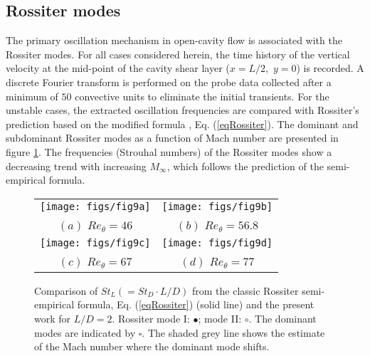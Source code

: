 \documentclass{jfm}
\begin{document}
\subsection{Rossiter modes} 
\label{RM}
The primary oscillation mechanism in open-cavity flow is associated with the Rossiter modes. For all cases considered herein, the time history of the vertical velocity at the mid-point of the cavity shear layer ($x=L/2,$ $y=0$) is recorded. A discrete Fourier transform is performed on the probe data collected after a minimum of $50$ convective units to eliminate the initial transients. For the unstable cases, the extracted oscillation frequencies  are compared with Rossiter's prediction based on the modified formula \citep{Heller:AIAA75}, Eq. (\ref{eqRossiter}).
The dominant and subdominant Rossiter modes as a function of Mach number are presented in figure \ref{fig:RossiterLD2}. The frequencies (Strouhal numbers) of the Rossiter modes show a decreasing trend with increasing $M_\infty$, which follows the prediction of the semi-empirical formula.

\begin{figure}
\begin{center}

  \begin{tabular}{cc}
    \vspace{-0.1in} \texttt{[image: figs/fig9a]}  & \texttt{[image: figs/fig9b]} \\
     $(a)$ $Re_\theta=46$&$(b)$ $Re_\theta=56.8$\\
    \vspace{-0.1in}  \texttt{[image: figs/fig9c]}  &  \texttt{[image: figs/fig9d]}   \\
      $(c)$ $Re_\theta=67$ &$(d)$ $Re_\theta=77$\\                 
  \end{tabular}

\end{center}
   \caption{Comparison of $St_L (=St_D \cdot L/D)$ from the classic Rossiter semi-empirical formula, Eq. (\ref{eqRossiter}) (solid line) and the present work for $L/D=2$. Rossiter mode I: $\bullet$; mode II: $\circ$. The dominant modes are indicated by $\square$. The shaded grey line shows the estimate of the Mach number where the dominant mode shifts. }
   \label{fig:RossiterLD2} 
\end{figure}
\end{document}
